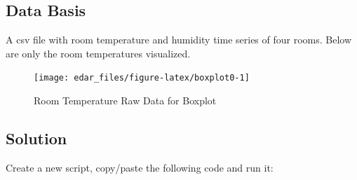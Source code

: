 \documentclass[
  a4paperpaper,
]{book}
\begin{document}
\hypertarget{data-basis}{%
\subsection{Data Basis}\label{data-basis}}

A csv file with room temperature and humidity time series of four rooms. Below are only the room temperatures visualized.

\begin{figure}
\texttt{[image: edar\_files/figure-latex/boxplot0-1]} \caption{Room Temperature Raw Data for Boxplot}\label{fig:boxplot0}
\end{figure}

\newpage

\hypertarget{solution}{%
\subsection{Solution}\label{solution}}

Create a new script, copy/paste the following code and run it:
\end{document}
